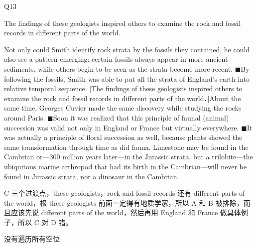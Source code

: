 \begin{blk}
    \begin{qst}
        Q13
    \end{qst}

    \begin{chc}
        The findings of these geologists inspired others to examine the rock and fossil records in different parts of the world.
    \end{chc}

    \begin{psgq}
        Not only could Smith identify rock strata by the fossils they contained, he could also see a pattern emerging: certain fossils always appear in more ancient sediments,  while others begin to be seen as the strata become more recent. $\blacksquare$By following the fossils, Smith was able to put all the strata of England's earth into relative temporal sequence.   [The findings of these geologists inspired others to examine the rock and fossil records in different parts of the world．]About the same time, Georges Cuvier made the same discovery while studying the rocks around Paris. $\blacksquare$Soon it was realized that this principle of faunal (animal) succession was  valid not only in England or France but virtually everywhere. $\blacksquare$It was actually a principle of floral succession as well, because plants showed the same transformation through time as did fauna. Limestone may be found in the Cambrian or—300 million years later—in the Jurassic strata, but a trilobite—the ubiquitous marine arthropod that had its birth in the Cambrian—will never be found in Jurassic strata, nor a dinosaur in the Cambrian.
    \end{psgq}

    \begin{nlz}
        C 三个过渡点，these geologists，rock and fossil records 还有 different parts of the world，根 these geologists 前面一定得有地质学家，所以 A 和 B 被排除，而且应该先说 different parts of the world，然后再用 England 和 France 做具体例子，所以 C 对 D 错。

        没有遍历所有空位
    \end{nlz}
\end{blk}
